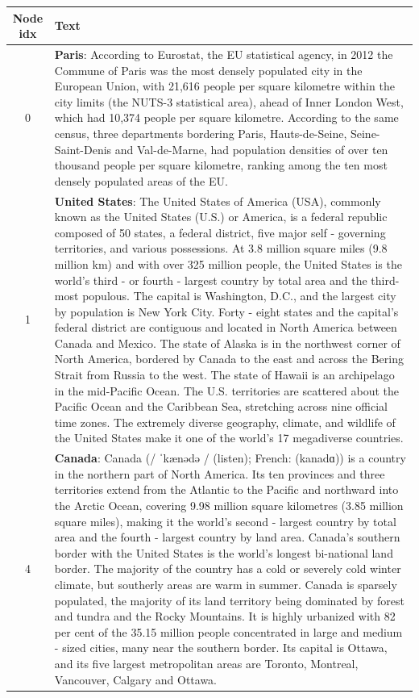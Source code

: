 \begin{table}[t]
\centering
\begin{tabularx}{\textwidth}{c X}
\toprule
Node idx & Text \\
\midrule
0 & \textbf{Paris}: According to Eurostat, the EU statistical agency, in 2012 the Commune of Paris was the most densely populated city in the European Union, with 21,616 people per square kilometre within the city limits (the NUTS-3 statistical area), ahead of Inner London West, which had 10,374 people per square kilometre. According to the same census, three departments bordering Paris, Hauts-de-Seine, Seine-Saint-Denis and Val-de-Marne, had population densities of over ten thousand people per square kilometre, ranking among the ten most densely populated areas of the EU. \\
1 & \textbf{United States}: The United States of America (USA), commonly known as the United States (U.S.) or America, is a federal republic composed of 50 states, a federal district, five major self - governing territories, and various possessions. At 3.8 million square miles (9.8 million km) and with over 325 million people, the United States is the world's third - or fourth - largest country by total area and the third-most populous. The capital is Washington, D.C., and the largest city by population is New York City. Forty - eight states and the capital's federal district are contiguous and located in North America between Canada and Mexico. The state of Alaska is in the northwest corner of North America, bordered by Canada to the east and across the Bering Strait from Russia to the west. The state of Hawaii is an archipelago in the mid-Pacific Ocean. The U.S. territories are scattered about the Pacific Ocean and the Caribbean Sea, stretching across nine official time zones. The extremely diverse geography, climate, and wildlife of the United States make it one of the world's 17 megadiverse countries. \\
4 & \textbf{Canada}: Canada (/ ˈkænədə / (listen); French: (kanadɑ)) is a country in the northern part of North America. Its ten provinces and three territories extend from the Atlantic to the Pacific and northward into the Arctic Ocean, covering 9.98 million square kilometres (3.85 million square miles), making it the world's second - largest country by total area and the fourth - largest country by land area. Canada's southern border with the United States is the world's longest bi-national land border. The majority of the country has a cold or severely cold winter climate, but southerly areas are warm in summer. Canada is sparsely populated, the majority of its land territory being dominated by forest and tundra and the Rocky Mountains. It is highly urbanized with 82 per cent of the 35.15 million people concentrated in large and medium - sized cities, many near the southern border. Its capital is Ottawa, and its five largest metropolitan areas are Toronto, Montreal, Vancouver, Calgary and Ottawa. \\

\end{tabularx}
\end{table}
